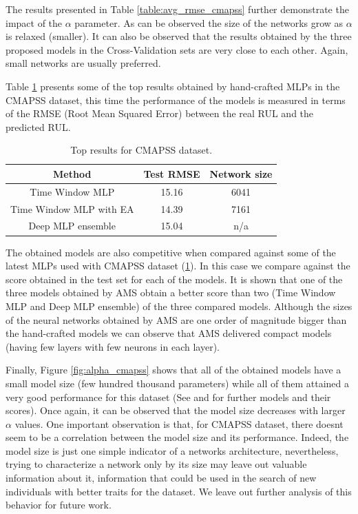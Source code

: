 \documentclass[journal]{IEEEtran}
\begin{document}
The results presented in Table \ref{table:avg_rmse_cmapss} further demonstrate the impact of the $\alpha$ parameter. As can be observed the size of the networks grow as $\alpha$ is relaxed (smaller). It can also be observed that the results obtained by the three proposed models in the Cross-Validation sets are very close to each other. Again, small networks are usually preferred.

Table \ref{table:CMAPSS_results_top} presents some of the top results obtained by hand-crafted MLPs in the CMAPSS dataset, this time the performance of the models is measured in terms of the RMSE (Root Mean Squared Error) between the real RUL and the predicted RUL. 

\begin{table}[!htb]
\begin{center}
\begin{tabular}{| c | c | c |}
\hline
Method & Test RMSE & Network size \\
\hline
Time Window MLP \cite{Lim2016} & 15.16 & 6041\\
Time Window MLP with EA \cite{Laredo2018} & 14.39 & 7161\\
Deep MLP ensemble \cite{Zhang2016} & 15.04 &  n/a \\
\hline
\end{tabular}
\end{center}
\caption{Top results for CMAPSS dataset.}
\label{table:CMAPSS_results_top}
\end{table}

The obtained models are also competitive when compared against some of the latest MLPs used with CMAPSS dataset (\ref{table:CMAPSS_results_top}). In this case we compare against the score obtained in the test set for each of the models. It is shown that one of the three models obtained by AMS obtain a better score than two (Time Window MLP and Deep MLP ensemble) of the three compared models. Although the sizes of the neural networks obtained by AMS are one order of magnitude bigger than the hand-crafted models we can observe that AMS delivered compact models (having few layers with few neurons in each layer).

Finally, Figure \ref{fig:alpha_cmapss} shows that all of the obtained models have a small model size (few hundred thousand parameters) while all of them attained a very good performance for this dataset (See \cite{Laredo2018} and \cite{Li2018} for further models and their scores). Once again, it can be observed that the model size decreases with larger $\alpha$ values. One important observation is that, for CMAPSS dataset, there doesnt seem to be a correlation between the model size and its performance. Indeed, the model size is just one simple indicator of a networks architecture, nevertheless, trying to characterize a network only by its size may leave out valuable information about it, information that could be used in the search of new individuals with better traits for the dataset. We leave out further analysis of this behavior for future work.
\end{document}
